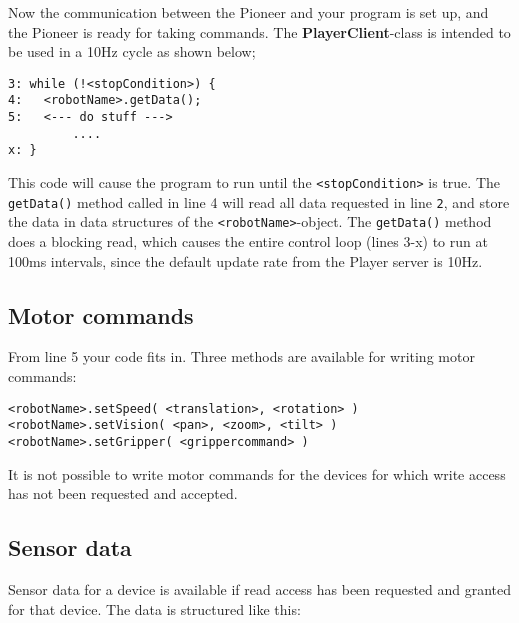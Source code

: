 \documentclass[11pt]{article}
\begin{document}
Now the communication between the Pioneer and your program is set up, and the Pioneer is ready for taking commands. The {\bf PlayerClient}-class is intended to be used in a 10Hz cycle as shown below;
\begin{verbatim}
3: while (!<stopCondition>) {
4:   <robotName>.getData();
5:   <--- do stuff --->
         ....
x: }
\end{verbatim}
This code will cause the program to run until the \texttt{<stopCondition>} is true. The \texttt{getData()} method called in line 4 will read all data requested in line \texttt{2}, and store the data in data structures of the \texttt{<robotName>}-object. The \texttt{getData()} method does a blocking read, which causes the entire control loop (lines 3-x) to run at 100ms intervals, since the default update rate from the Player server is 10Hz.

\subsection{Motor commands}
From line 5 your code fits in. Three methods are available for writing motor commands:
\begin{verbatim}
<robotName>.setSpeed( <translation>, <rotation> )
<robotName>.setVision( <pan>, <zoom>, <tilt> )
<robotName>.setGripper( <grippercommand> )
\end{verbatim}

It is not possible to write motor commands for the devices for which write access has not been requested and accepted.

\subsection{Sensor data}
Sensor data for a device is available if read access has been requested and granted for that device. The data is structured like this:
   
\end{document}
